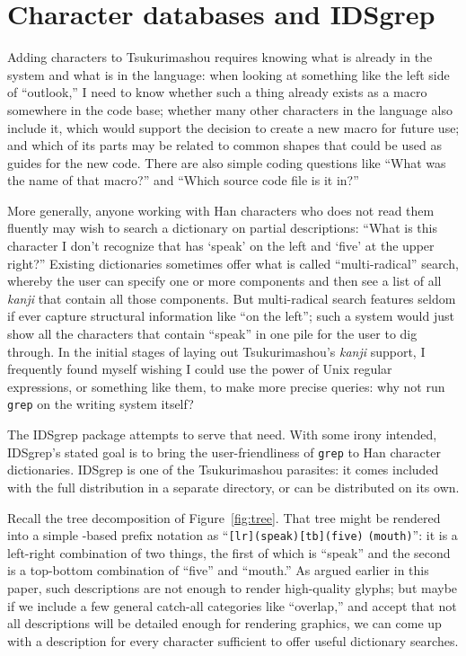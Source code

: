 \documentclass{ltugboat}
\begin{document}

\section{Character databases and IDSgrep}

Adding characters to Tsukurimashou requires knowing what is already in the
system and what is in the language: when looking at something like the left
side of ``outlook,'' I need to know whether such a thing already exists as a
macro somewhere in the code base; whether many other characters in the
language also include it, which would support the decision to create a new
macro for future use; and which of its parts may be related to common shapes
that could be used as guides for the new code.  There are also simple coding
questions like ``What was the name of that macro?'' and ``Which source code
file is it in?''

More generally, anyone working with Han characters who does not read them
fluently may wish to search a dictionary on partial descriptions: ``What
is this character I don't recognize that has `speak' on the left and `five'
at the upper right?'' Existing dictionaries sometimes offer what is called
``multi-radical'' search, whereby the user can specify one or more
components and then see a list of all \emph{kanji} that contain all those
components.  But multi-radical
\linebreak%
 search features seldom if ever capture
structural information like ``on the left''; such a system would just show
all the characters that contain ``speak'' in one pile for the user to dig
through.  In the initial stages of laying out Tsukurimashou's \emph{kanji}
support, I frequently found myself wishing I could use the power of Unix
regular expressions, or something like them, to make more precise queries:
why not run \verb|grep| on the writing system itself?

The IDSgrep package attempts to serve that need.  With some irony intended,
IDSgrep's stated goal is to bring the user-friendliness of \verb|grep| to
Han character dictionaries.  IDSgrep is one of the Tsuku\-rimashou parasites:
it comes included with the full distribution in a separate directory, or can
be distributed on its own.

Recall the tree decomposition of Figure~\ref{fig:tree}.  That tree might be
rendered into a simple -based prefix notation as
``\verb|[lr](speak)[tb](five)|
\linebreak%
\verb|(mouth)|'':  it is a left-right combination of
two 
\linebreak%
things, the first of which is ``speak'' and the second is a top-bottom
combination of ``five'' and ``mouth.''  As argued earlier in this paper,
such descriptions are not enough to render high-quality glyphs; but maybe if
we include a few general catch-all categories like ``overlap,'' and accept
that not all descriptions will be detailed enough for rendering graphics, we
can come up with a description for every character sufficient to offer
useful dictionary searches.
\end{document}
